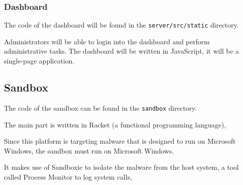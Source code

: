 \subsubsection{Dashboard}
The code of the dashboard will be found in the \texttt{server/src/static} directory.

Administrators will be able to login into the dashboard and perform administrative tasks.
The dashboard will be written in JavaScript, it will be a single-page application.



\subsection{Sandbox}
The code of the sandbox can be found in the \texttt{sandbox} directory.

The main part is written in Racket (a functional programming language),


Since this platform is targeting malware that is designed to run on Microsoft Windows,
the sandbox must run on Microsoft Windows.

It makes use of Sandboxie to isolate the malware from the host system,
a tool called Process Monitor to log system calls,






